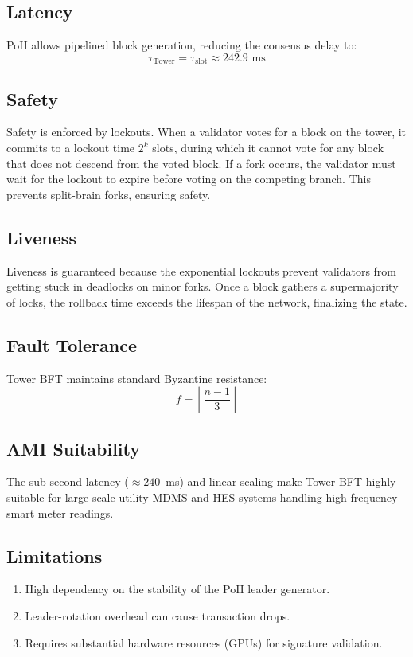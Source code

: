 \documentclass[12pt, oneside, a4paper]{report}
\theoremstyle{definition}
\theoremstyle{remark}
\begin{document}
\subsection{Latency}
PoH allows pipelined block generation, reducing the consensus delay to:
\begin{equation}
\tau_{\mathrm{Tower}} = \tau_{\mathrm{slot}} \approx 242.9 \text{ ms}
\end{equation}

\subsection{Safety}
Safety is enforced by lockouts. When a validator votes for a block on the tower, it commits to a lockout time $2^k$ slots, during which it cannot vote for any block that does not descend from the voted block. If a fork occurs, the validator must wait for the lockout to expire before voting on the competing branch. This prevents split-brain forks, ensuring safety.

\subsection{Liveness}
Liveness is guaranteed because the exponential lockouts prevent validators from getting stuck in deadlocks on minor forks. Once a block gathers a supermajority of locks, the rollback time exceeds the lifespan of the network, finalizing the state.

\subsection{Fault Tolerance}
Tower BFT maintains standard Byzantine resistance:
\begin{equation}
f = \left\lfloor \frac{n-1}{3} \right\rfloor
\end{equation}

\subsection{AMI Suitability}
The sub-second latency ($\approx 240$~ms) and linear scaling make Tower BFT highly suitable for large-scale utility MDMS and HES systems handling high-frequency smart meter readings.

\subsection{Limitations}
\begin{enumerate}
  \item High dependency on the stability of the PoH leader generator.
  \item Leader-rotation overhead can cause transaction drops.
  \item Requires substantial hardware resources (GPUs) for signature validation.
\end{enumerate}
\end{document}
